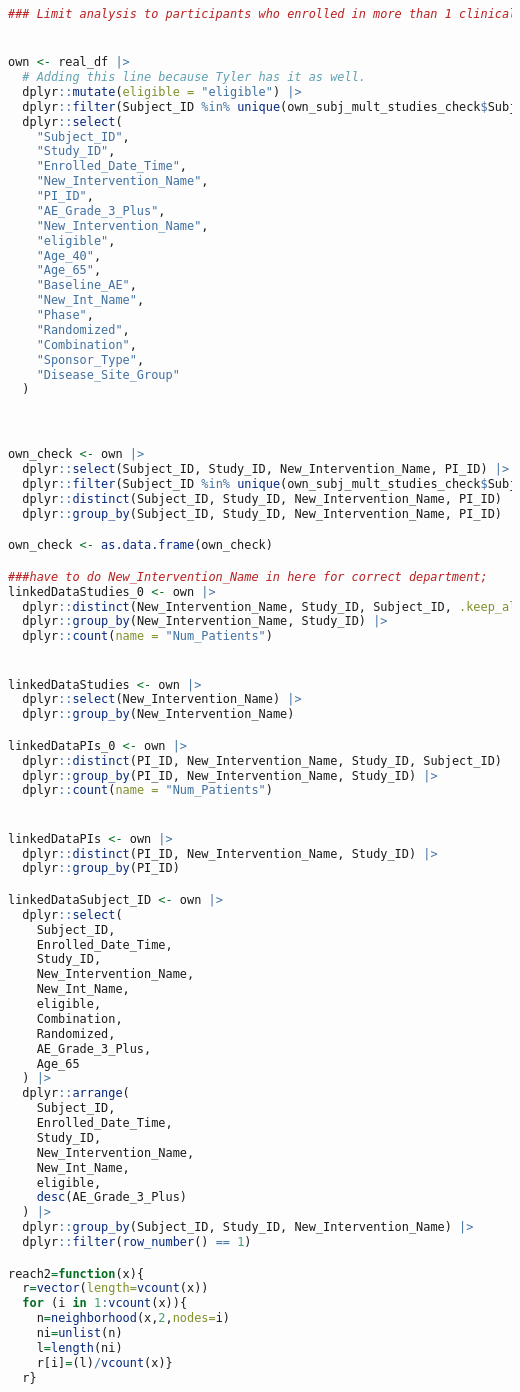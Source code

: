 \documentclass{article}
\begin{document}
\begin{lstlisting}[language=R]
### Limit analysis to participants who enrolled in more than 1 clinical trial;


own <- real_df |>
  # Adding this line because Tyler has it as well. 
  dplyr::mutate(eligible = "eligible") |>
  dplyr::filter(Subject_ID %in% unique(own_subj_mult_studies_check$Subject_ID)) |>
  dplyr::select(
    "Subject_ID",
    "Study_ID",
    "Enrolled_Date_Time",
    "New_Intervention_Name",
    "PI_ID",
    "AE_Grade_3_Plus",
    "New_Intervention_Name",
    "eligible",
    "Age_40",
    "Age_65",
    "Baseline_AE",
    "New_Int_Name",
    "Phase",
    "Randomized",
    "Combination",
    "Sponsor_Type",
    "Disease_Site_Group"
  )



own_check <- own |>
  dplyr::select(Subject_ID, Study_ID, New_Intervention_Name, PI_ID) |>
  dplyr::filter(Subject_ID %in% unique(own_subj_mult_studies_check$Subject_ID)) |>
  dplyr::distinct(Subject_ID, Study_ID, New_Intervention_Name, PI_ID) |>
  dplyr::group_by(Subject_ID, Study_ID, New_Intervention_Name, PI_ID)

own_check <- as.data.frame(own_check)

###have to do New_Intervention_Name in here for correct department;
linkedDataStudies_0 <- own |>
  dplyr::distinct(New_Intervention_Name, Study_ID, Subject_ID, .keep_all = TRUE) |>
  dplyr::group_by(New_Intervention_Name, Study_ID) |>
  dplyr::count(name = "Num_Patients")


linkedDataStudies <- own |>
  dplyr::select(New_Intervention_Name) |>
  dplyr::group_by(New_Intervention_Name)

linkedDataPIs_0 <- own |>
  dplyr::distinct(PI_ID, New_Intervention_Name, Study_ID, Subject_ID) |>
  dplyr::group_by(PI_ID, New_Intervention_Name, Study_ID) |>
  dplyr::count(name = "Num_Patients")


linkedDataPIs <- own |>
  dplyr::distinct(PI_ID, New_Intervention_Name, Study_ID) |>
  dplyr::group_by(PI_ID)

linkedDataSubject_ID <- own |>
  dplyr::select(
    Subject_ID,
    Enrolled_Date_Time,
    Study_ID,
    New_Intervention_Name,
    New_Int_Name,
    eligible,
    Combination,
    Randomized,
    AE_Grade_3_Plus,
    Age_65
  ) |>
  dplyr::arrange(
    Subject_ID,
    Enrolled_Date_Time,
    Study_ID,
    New_Intervention_Name,
    New_Int_Name,
    eligible,
    desc(AE_Grade_3_Plus)
  ) |>
  dplyr::group_by(Subject_ID, Study_ID, New_Intervention_Name) |>
  dplyr::filter(row_number() == 1)

reach2=function(x){
  r=vector(length=vcount(x))
  for (i in 1:vcount(x)){
    n=neighborhood(x,2,nodes=i)
    ni=unlist(n)
    l=length(ni)
    r[i]=(l)/vcount(x)}
  r}


\end{lstlisting}
\end{document}
